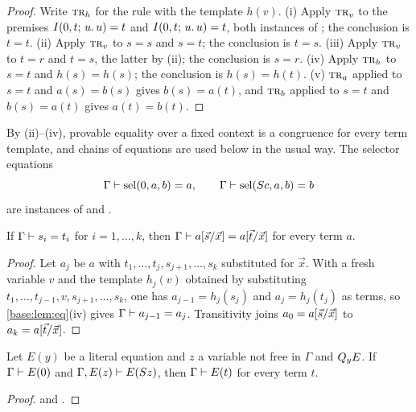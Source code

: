 \begin{proof}
Write $\rulename{Tr}_h$ for the rule with the template $h(v)$.
(i) Apply $\rulename{Tr}_v$ to the premises $I(0,t;\,u.\,u)=t$ and
$I(0,t;\,u.\,u)=t$, both instances of ; the conclusion is
$t=t$.
(ii) Apply $\rulename{Tr}_v$ to $s=s$ and $s=t$; the conclusion is $t=s$.
(iii) Apply $\rulename{Tr}_v$ to $t=r$ and $t=s$, the latter by (ii); the
conclusion is $s=r$.
(iv) Apply $\rulename{Tr}_h$ to $s=t$ and $h(s)=h(s)$; the conclusion is
$h(s)=h(t)$.
(v) $\rulename{Tr}_a$ applied to $s=t$ and $a(s)=b(s)$ gives $b(s)=a(t)$,
and $\rulename{Tr}_b$ applied to $s=t$ and $b(s)=a(t)$ gives $a(t)=b(t)$.
\end{proof}

By (ii)--(iv), provable equality over a fixed context is a congruence for
every term template, and chains of equations are used below in the usual
way.  The selector equations
\begin{equation}
 \Gamma\vdash\operatorname{sel}(0,a,b)=a,\qquad\Gamma\vdash\operatorname{sel}(S c,a,b)=b
 \label{base:eq:sel}
\end{equation}
are instances of  and .

\begin{lemma}
\label{base:lem:cong}
If $\Gamma\vdash s_i=t_i$ for $i=1,\dots,k$, then
$\Gamma\vdash a[\vec s/\vec x]=a[\vec t/\vec x]$ for every
term $a$.
\end{lemma}

\begin{proof}
Let $a_j$ be $a$ with $t_1,\dots,t_j,s_{j+1},\dots,s_k$ substituted for
$\vec x$.  With a fresh variable $v$ and the template
$h_j(v)$ obtained by substituting $t_1,\dots,t_{j-1},v,s_{j+1},\dots,s_k$,
one has $a_{j-1}=h_j(s_j)$ and $a_j=h_j(t_j)$ as terms, so
\cref{base:lem:eq}(iv) gives $\Gamma\vdash a_{j-1}=a_j$.  Transitivity
joins $a_0=a[\vec s/\vec x]$ to $a_k=a[\vec t/\vec x]$.
\end{proof}

\begin{lemma}
\label{base:lem:eqind}
Let $E(y)$ be a literal equation and $z$ a variable not free in $\Gamma$ and
$Q_{y}E$.  If $\Gamma\vdash E(0)$ and $\Gamma,E(z)\vdash E(S z)$, then
$\Gamma\vdash E(t)$ for every term $t$.
\end{lemma}

\begin{proof}
 and .
\end{proof}

